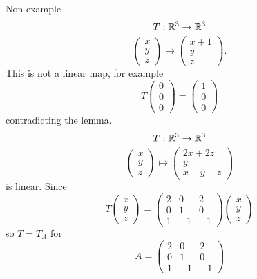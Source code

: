 \documentclass[10pt, a4paper]{article}
\begin{document}
\begin{example}
\begin{enumerate}[label = (\roman*)]
        Non-example
        \[
        T : \mathbb{R} ^ 3 \rightarrow \mathbb{R} ^ 3
        \]
        \[
        \begin{pmatrix}
            x \\ y \\ z
        \end{pmatrix} \mapsto
        \begin{pmatrix}
            x + 1 \\ y \\ z
        \end{pmatrix}.
        \]
        This is not a linear map,
        for example
        \[
        T\begin{pmatrix}
            0 \\ 0 \\ 0
        \end{pmatrix} = \begin{pmatrix}
            1 \\ 0 \\ 0
        \end{pmatrix}
        \]
        contradicting the lemma.
        \[
        T : \mathbb{R} ^ 3 \rightarrow \mathbb{R} ^ 3
        \]
        \[
        \begin{pmatrix}
            x \\ y \\ z
        \end{pmatrix}
        \mapsto
        \begin{pmatrix}
            2x + 2z \\ y \\ x - y - z
        \end{pmatrix}
        \]
        is linear.
        Since
        \[
        T\begin{pmatrix}
            x \\ y \\ z
        \end{pmatrix}
        =
        \begin{pmatrix}
            2 & 0 & 2 \\ 0 & 1 & 0 \\ 1 & -1 & -1
        \end{pmatrix}
        \begin{pmatrix}
            x \\ y \\ z
        \end{pmatrix}
        \]
        so $T = T_A$ for
        \[
        A = 
        \begin{pmatrix}
            2 & 0 & 2 \\ 0 & 1 & 0 \\ 1 & -1 & -1
        \end{pmatrix}
        \]
    \end{enumerate}
\end{example}
\end{document}
